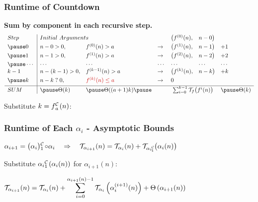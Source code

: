 \begin{frame}
\frametitle{Runtime of Countdown}

\pause
\textbf{Sum by component in each recursive step.}
\begin{equation*}
\begin{array}{l|llllll}
Step & \multicolumn{2}{l}{Initial \ Arguments} &  & \big(f^{(0)}(n), & n - 0 \big) &  \\[3pt]
\pause 0    & n - 0 > 0,     & f^{(0)}(n) > a & \to & \big(f^{(1)}(n), & n - 1\big) & + 1 \\[3pt]
\pause 1    & n - 1 > 0, & f^{(1)}(n) > a & \to & \big(f^{(2)}(n), & n - 2\big) & + 2 \\[3pt]
\pause \cdots & \cdots & \cdots & \cdots & \cdots & \cdots & \cdots \\
k-1  & n - (k-1) > 0, & f^{(k-1)}(n) > a & \to & \big(f^{(k)}(n), & n - k\big) & + k \\[3pt]
\pause k & n - k \mathrel{?} 0, & {\color{red} f^{(k)}(n) \le a}  &\to & \multicolumn{2}{l}{0} &  \\[3pt] \hline
SUM & \pause \Theta(k) & \pause \Theta((a+1)k) \pause & &  \multicolumn{2}{c}{\sum_{i=0}^{k-1}\runtime_f\big(f^{i}(n)\big)} & \pause \Theta(k)
\end{array}
\end{equation*}


\pause
Substitute $k = \cdt{f}{a}(n)$:
\end{frame}



\begin{frame}
\frametitle{Runtime of Each $\alpha_i$ - Asymptotic Bounds}

$\displaystyle
\alpha_{i+1} = \cdt{\big(\alpha_i\big)}{1}\circ \alpha_i
\quad \implies \quad \runtime_{\alpha_{i+1}}(n) = \runtime_{\alpha_i}(n) + \runtime_{\cdt{\alpha_i}{1}}\big(\alpha_i(n)\big)
$

\smallskip
{}

\bigskip

Substitute $\cdt{\alpha_i}{1}(\alpha_i(n))$ for $\alpha_{i+1}(n)$:
\bigskip

$ \displaystyle 
\mathcal{T}_{\alpha_{i+1}}(n)
  = \mathcal{T}_{\alpha_i}(n) + 
  \sum_{i=0}^{\alpha_{i+1}(n) - 1} \mathcal{T}_{\alpha_i}\left(\alpha_i^{(i+1)}(n)\right) + \Theta\left(\alpha_{i+1}(n) \right)
$

\smallskip
{}

\end{frame}


